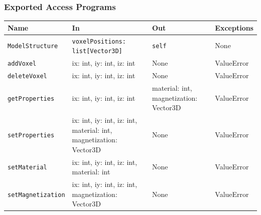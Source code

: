 \documentclass[12pt, titlepage]{article}
\begin{document}
\subsubsection{Exported Access Programs}
\begin{center}
\renewcommand{\arraystretch}{1.55}
\begin{tabular}{p{4cm} p{5cm} p{3cm} p{3cm}}
\toprule
\textbf{Name} & \textbf{In} & \textbf{Out} & \textbf{Exceptions} \\
\midrule
\texttt{ModelStructure} & \texttt{voxelPositions: list[Vector3D]} & \texttt{self} & None \\
\texttt{addVoxel} & ix: int, iy: int, iz: int & None & ValueError \\
\texttt{deleteVoxel} & ix: int, iy: int, iz: int & None & ValueError \\
\texttt{getProperties} & ix: int, iy: int, iz: int & material: int, \newline magnetization: Vector3D & ValueError \\
\texttt{setProperties} & ix: int, iy: int, iz: int, \newline material: int, \newline magnetization: Vector3D & None & ValueError \\
\texttt{setMaterial} & ix: int, iy: int, iz: int, \newline material: int & None & ValueError \\
\texttt{setMagnetization} & ix: int, iy: int, iz: int, \newline magnetization: Vector3D & None & ValueError \\

\bottomrule
\end{tabular}
\end{center}
\end{document}
